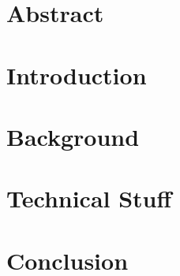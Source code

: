 \documentclass[a4paper,12pt,titlepage,]{scrreprt}
\begin{document}


\section{Abstract}

\section{Introduction}

\section{Background}

\section{Technical Stuff}

\section{Conclusion}


\end{document}

